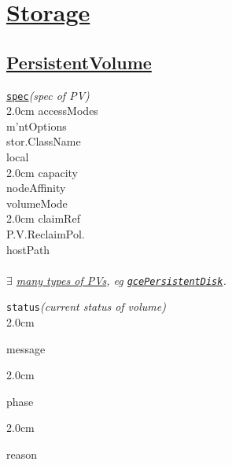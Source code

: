 \section{\href{https://kubernetes.io/docs/concepts/storage/}{Storage}}







\subsection*{\href{https://kubernetes.io/docs/concepts/storage/persistent-volumes/}{PersistentVolume}}


\texttt{\href{https://kubernetes.io/docs/reference/kubernetes-api/config-and-storage-resources/persistent-volume-v1/}{spec}}\quad\textit{(spec of PV)}\\[-2mm]
\api
{2.0cm}{
accessModes     \\
m'ntOptions     \\
stor.ClassName  \\
local           \\

}
{2.0cm}{
capacity        \\
nodeAffinity    \\
volumeMode      \\

}
{2.0cm}{
claimRef        \\
P.V.ReclaimPol. \\
hostPath        \\

}
\stopapi
\\
\textit{$\exists$ \href{https://kubernetes.io/docs/reference/kubernetes-api/config-and-storage-resources/persistent-volume-v1/\#persistent-volumes}{many types of PVs}, eg {\tt \href{https://kubernetes.io/docs/concepts/storage/volumes\#gcepersistentdisk}{gcePersistentDisk}}.}

\texttt{status}\quad\textit{(current status of volume)}\\[-2mm]
\api
{2.0cm}{
message

}
{2.0cm}{
phase

}
{2.0cm}{
reason

}
\stopapi


